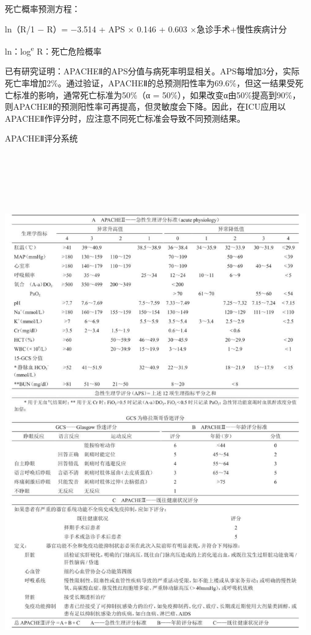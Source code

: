 死亡概率预测方程：

ln（R/1 − R）= −3.514 + APS × 0.146 + 0.603 ×急诊手术+慢性疾病计分

ln：log\textsuperscript{e} R：死亡危险概率

已有研究证明：APACHEⅡ的APS分值与病死率明显相关。APS每增加3分，实际死亡率增加2\%。通过验证，APACHEⅡ的总预测阳性率为69.6\%，但这一结果受死亡标准的影响，通常死亡标准为50\%（α
=
50\%），如果改变α由50\%提高到90\%，则APACHEⅡ的预测阳性率可再提高，但灵敏度会下降。因此，在ICU应用以APACHEⅡ作评分时，应注意不同死亡标准会导致不同预测结果。

\begin{table}[htbp]
\centering
\caption{APACHEⅡ评分系统}
\label{tab147-1}
\includegraphics[width=6.78125in,height=9.34375in]{./images/Image00535.jpg}
\end{table}

